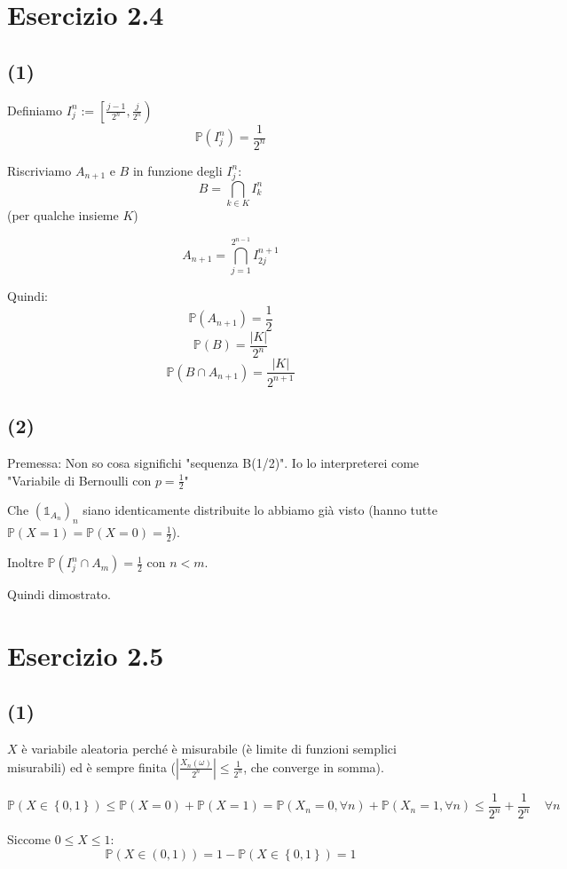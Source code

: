 \documentclass{article}
\begin{document}
\section{Esercizio 2.4}
\subsection{(1)}
Definiamo $I_j^n := \left[\frac{j-1}{2^n}, \frac{j}{2^n}\right)$
\[\mathbb{P}\left(I_j^n\right) = \frac{1}{2^n}\]

Riscriviamo $A_{n+1}$ e $B$ in funzione degli $I_j^n$:
\[
	B = \bigcap_{k\in K} I_k^n
\]
(per qualche insieme $K$)

\[
	A_{n+1} = \bigcap_{j=1}^{2^{n-1}} I_{2j}^{n+1}
\]

Quindi:
\[
	\mathbb{P}(A_{n+1}) = \frac{1}{2}
\]
\[
	\mathbb{P}(B) = \frac{|K|}{2^n}
\]
\[
	\mathbb{P}\left(B \cap  A_{n+1}\right) = \frac{|K|}{2^{n+1}}
\]

\subsection{(2)}
Premessa: Non so cosa significhi "sequenza B(1/2)". Io lo interpreterei come "Variabile di Bernoulli con $p=\frac{1}{2}$"

Che $\left(\mathds{1}_{A_n}\right)_n$ siano identicamente distribuite lo abbiamo già visto (hanno tutte $\mathbb{P}(X=1)= \mathbb{P}(X=0) = \frac{1}{2}$).

Inoltre $\mathbb{P}\left(I_j^n \cap A_m\right) = \frac{1}{2}$ con $n<m$.

Quindi dimostrato.

\section{Esercizio 2.5}
\subsection{(1)}
$X$ è variabile aleatoria perché è misurabile (è limite di funzioni semplici misurabili) ed è sempre finita ($\left| \frac{X_n(\omega )}{2^n} \right| \leq  \frac{1}{2^n}$, che converge in somma).

\[
	\mathbb{P}\left(X\in \left\{0,1\right\}\right) \leq  \mathbb{P}\left(X=0\right) + \mathbb{P}\left(X=1\right) = \mathbb{P}\left(X_n = 0, \forall  n\right) + \mathbb{P}\left(X_n = 1, \forall  n\right)  \leq  \frac{1}{2^n} + \frac{1}{2^n} \ \ \ \ \  \forall  n
\]

Siccome $0 \leq  X \leq  1$:
\[
	\mathbb{P}\left(X \in (0,1)\right) = 1-\mathbb{P}\left(X \in \left\{0,1\right\}\right) = 1
\]
\end{document}
